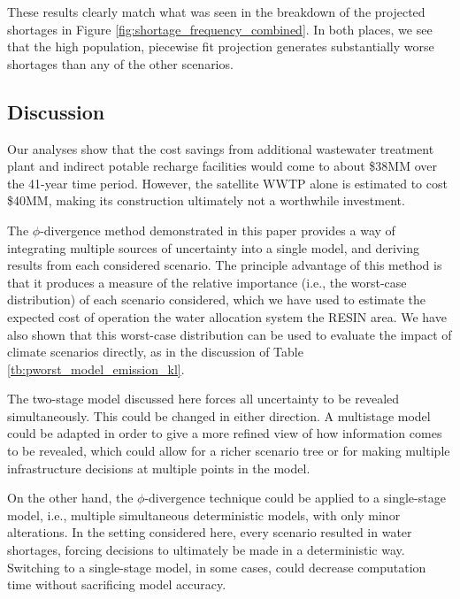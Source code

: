 \documentclass[opre,nonblindrev]{informs3} %
\begin{document}
These results clearly match what was seen in the breakdown of the projected shortages in Figure \ref{fig:shortage_frequency_combined}.
In both places, we see that the high population, piecewise fit projection generates substantially worse shortages than any of the other scenarios.


\subsection{Discussion}

Our analyses show that the cost savings from additional wastewater treatment plant and indirect potable recharge facilities would come to about \$38MM over the 41-year time period.
However, the satellite WWTP alone is estimated to cost \$40MM, making its construction ultimately not a worthwhile investment.

The $\phi$-divergence method demonstrated in this paper provides a way of integrating multiple sources of uncertainty into a single model, and deriving results from each considered scenario.
The principle advantage of this method is that it produces a measure of the relative importance (i.e., the worst-case distribution) of each scenario considered, which we have used to estimate the expected cost of operation the water allocation system the RESIN area.
We have also shown that this worst-case distribution can be used to evaluate the impact of climate scenarios directly, as in the discussion of Table \ref{tb:pworst_model_emission_kl}.

The two-stage model discussed here forces all uncertainty to be revealed simultaneously.
This could be changed in either direction.
A multistage model could be adapted in order to give a more refined view of how information comes to be revealed, which could allow for a richer scenario tree or for making multiple infrastructure decisions at multiple points in the model.

On the other hand, the $\phi$-divergence technique could be applied to a single-stage model, i.e., multiple simultaneous deterministic models, with only minor alterations.
In the setting considered here, every scenario resulted in water shortages, forcing decisions to ultimately be made in a deterministic way.
Switching to a single-stage model, in some cases, could decrease computation time without sacrificing model accuracy.



\end{document}

